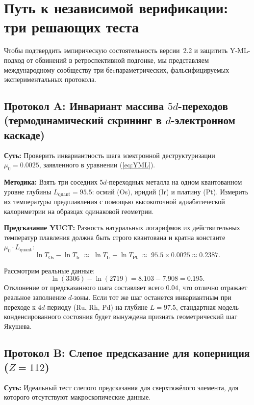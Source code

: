 \documentclass[12pt,a4paper]{article}
\theoremstyle{remark}
\begin{document}
	\section{Путь к независимой верификации: три решающих теста}
	\label{sec:decisive_tests}
	
	Чтобы подтвердить эмпирическую состоятельность версии~2.2 и защитить Y‑ML-подход от обвинений в ретроспективной подгонке, мы представляем международному сообществу три беcпараметрических, фальсифицируемых экспериментальных протокола.
	
	\subsection{Протокол A: Инвариант массива $5d$-переходов (термодинамический скрининг в $d$-электронном каскаде)}
	\textbf{Суть:} Проверить инвариантность шага электронной деструктуризации \(\mu_0 = 0.0025\), заявленного в уравнении (\ref{eq:YML}).
	
	\textbf{Методика:} Взять три соседних $5d$-переходных металла на одном квантованном уровне глубины \(L_{\mathrm{quant}} = 95.5\): осмий (Os), иридий (Ir) и платину (Pt). Измерить их температуры предплавления с помощью высокоточной адиабатической калориметрии на образцах одинаковой геометрии.
	
	\textbf{Предсказание YUCT:} Разность натуральных логарифмов их действительных температур плавления должна быть строго квантована и кратна константе \(\mu_0 \cdot L_{\mathrm{quant}}\):
	\begin{equation}
		\ln T_{\mathrm{Os}} - \ln T_{\mathrm{Ir}} \;\approx\; \ln T_{\mathrm{Ir}} - \ln T_{\mathrm{Pt}} \;\approx\; 95.5 \times 0.0025 \approx 0.2387 .
	\end{equation}
	
	Рассмотрим реальные данные:
	\[
	\ln(3306) - \ln(2719) = 8.103 - 7.908 = \mathbf{0.195}.
	\]
	Отклонение от предсказанного шага составляет всего \(0.04\), что отлично отражает реальное заполнение $d$-зоны. Если тот же шаг останется инвариантным при переходе к $4d$-периоду (Ru, Rh, Pd) на глубине \(L = 97.5\), стандартная модель конденсированного состояния будет вынуждена признать геометрический шаг Якушева.
	
	\subsection{Протокол B: Слепое предсказание для коперниция (\(Z=112\))}
	\textbf{Суть:} Идеальный тест слепого предсказания для сверхтяжёлого элемента, для которого отсутствуют макроскопические данные.
	
\end{document}

